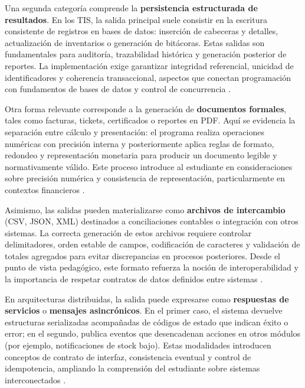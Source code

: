 \documentclass[12pt,twoside]{book}
\begin{document}
					Una segunda categoría comprende la \textbf{persistencia estructurada de resultados}. En los TIS, la salida principal suele consistir en la escritura consistente de registros en bases de datos: inserción de cabeceras y detalles, actualización de inventarios o generación de bitácoras. Estas salidas son fundamentales para auditoría, trazabilidad histórica y generación posterior de reportes. La implementación exige garantizar integridad referencial, unicidad de identificadores y coherencia transaccional, aspectos que conectan programación con fundamentos de bases de datos y control de concurrencia \cite{Silberschatz2020Database,Elmasri2016Database,Date2019Database}.
					
					Otra forma relevante corresponde a la generación de \textbf{documentos formales}, tales como facturas, tickets, certificados o reportes en PDF. Aquí se evidencia la separación entre cálculo y presentación: el programa realiza operaciones numéricas con precisión interna y posteriormente aplica reglas de formato, redondeo y representación monetaria para producir un documento legible y normativamente válido. Este proceso introduce al estudiante en consideraciones sobre precisión numérica y consistencia de representación, particularmente en contextos financieros \cite{IEEE2019Standard754,Chapra2014Numerical,Laudon2020Management}.
					
					Asimismo, las salidas pueden materializarse como \textbf{archivos de intercambio} (CSV, JSON, XML) destinados a conciliaciones contables o integración con otros sistemas. La correcta generación de estos archivos requiere controlar delimitadores, orden estable de campos, codificación de caracteres y validación de totales agregados para evitar discrepancias en procesos posteriores. Desde el punto de vista pedagógico, este formato refuerza la noción de interoperabilidad y la importancia de respetar contratos de datos definidos entre sistemas \cite{ISO247722024Programming,Date2019Database,Elmasri2016Database}.
					
					En arquitecturas distribuidas, la salida puede expresarse como \textbf{respuestas de servicios} o \textbf{mensajes asincrónicos}. En el primer caso, el sistema devuelve estructuras serializadas acompañadas de códigos de estado que indican éxito o error; en el segundo, publica eventos que desencadenan acciones en otros módulos (por ejemplo, notificaciones de stock bajo). Estas modalidades introducen conceptos de contrato de interfaz, consistencia eventual y control de idempotencia, ampliando la comprensión del estudiante sobre sistemas interconectados \cite{Pressman2019Software,Sommerville2015Software,ISO247722024Programming}.
					
\end{document}

